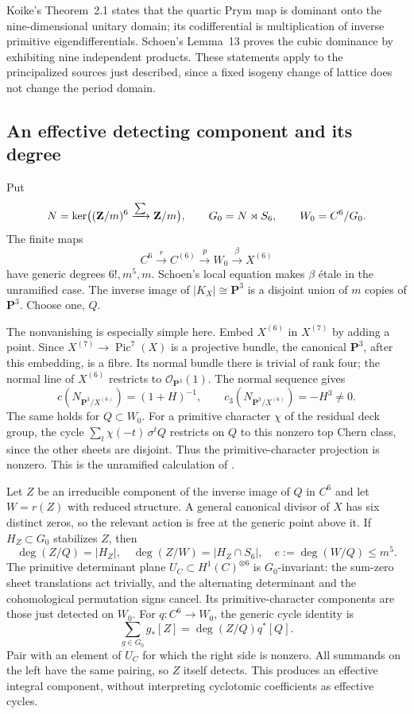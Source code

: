 Koike's Theorem~2.1 states that the quartic Prym map is dominant onto the nine-dimensional unitary domain; its codifferential is multiplication of inverse primitive eigendifferentials. Schoen's Lemma~13 proves the cubic dominance by exhibiting nine independent products. These statements apply to the principalized sources just described, since a fixed isogeny change of lattice does not change the period domain.

\subsection{An effective detecting component and its degree}

Put
\[
 N=\ker\bigl((\mathbf Z/m)^6\xrightarrow{\sum}\mathbf Z/m\bigr),
 \qquad G_0=N\rtimes S_6,
 \qquad W_0=C^6/G_0.
\]
The finite maps
\[
 C^6\xrightarrow{r}C^{(6)}\xrightarrow{p}W_0
 \xrightarrow{\beta}X^{(6)}
\]
have generic degrees $6!,m^5,m$. Schoen's local equation \cite[Lemma~2.2, p.~13]{Schoen88} makes $\beta$ \'etale in the unramified case. The inverse image of $|K_X|\cong\mathbf P^3$ is a disjoint union of $m$ copies of $\mathbf P^3$. Choose one, $Q$.

The nonvanishing is especially simple here. Embed $X^{(6)}$ in $X^{(7)}$ by adding a point. Since $X^{(7)}\to\operatorname{Pic}^7(X)$ is a projective bundle, the canonical $\mathbf P^3$, after this embedding, is a fibre. Its normal bundle there is trivial of rank four; the normal line of $X^{(6)}$ restricts to $\mathcal O_{\mathbf P^3}(1)$. The normal sequence gives
\[
 c(N_{\mathbf P^3/X^{(6)}})=(1+H)^{-1},
 \qquad c_3(N_{\mathbf P^3/X^{(6)}})=-H^3\ne0.
\]
The same holds for $Q\subset W_0$. For a primitive character $\chi$ of the residual deck group, the cycle
$\sum_t\chi(-t)\,\sigma^tQ$ restricts on $Q$ to this nonzero top Chern class, since the other sheets are disjoint. Thus the primitive-character projection is nonzero. This is the unramified calculation of \cite[Lemma~2.6, p.~16]{Schoen88}.

Let $Z$ be an irreducible component of the inverse image of $Q$ in $C^6$ and let $W=r(Z)$ with reduced structure. A general canonical divisor of $X$ has six distinct zeros, so the relevant action is free at the generic point above it. If $H_Z\subset G_0$ stabilizes $Z$, then
\[
 \deg(Z/Q)=|H_Z|,
 \quad \deg(Z/W)=|H_Z\cap S_6|,
 \quad e:=\deg(W/Q)\le m^5.
\]
The primitive determinant plane $U_C\subset H^1(C)^{\otimes6}$ is $G_0$-invariant: the sum-zero sheet translations act trivially, and the alternating determinant and the cohomological permutation signs cancel. Its primitive-character components are those just detected on $W_0$. For $q:C^6\to W_0$, the generic cycle identity is
\[
 \sum_{g\in G_0}g_*[Z]=\deg(Z/Q)q^*[Q].
\]
Pair with an element of $U_C$ for which the right side is nonzero. All summands on the left have the same pairing, so $Z$ itself detects. This produces an effective integral component, without interpreting cyclotomic coefficients as effective cycles.

